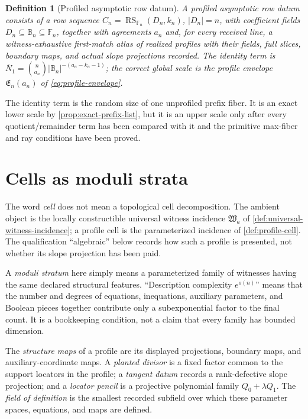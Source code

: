 \documentclass[12pt,a4paper]{amsart}
\numberwithin{equation}{section}
\newtheorem{definition}[definition]{Definition}
\theoremstyle{remark}
\DeclareMathOperator{\RS}{RS}
\newcommand{\F}{\mathbb F}
\newcommand{\B}{\mathbb B}
\newcommand{\barN}{\overline N}
\newcommand{\abs}[1]{\lvert #1\rvert}
\begin{document}
\begin{definition}[Profiled asymptotic row datum]
\label{def:asymptotic-row}
A \emph{profiled asymptotic row datum} consists of a row sequence
\(C_n=\RS_{\F_n}(D_n,k_n)\), \(\abs{D_n}=n\), with coefficient fields
\(D_n\subseteq\B_n\subseteq\F_n\), together with agreements \(a_n\)
and, for every received line, a witness-exhaustive first-match atlas of
realized profiles with their fields, full slices, boundary maps, and actual
slope projections recorded.  The identity term is
\(\barN_1=\binom n{a_n}\abs{\B_n}^{-(a_n-k_n-1)}\); the correct global
scale is the profile envelope \(\mathfrak E_n(a_n)\) of
\eqref{eq:profile-envelope}.
\end{definition}

The identity term is the random size of one unprofiled prefix fiber.  It is
an exact lower scale by \cref{prop:exact-prefix-list}, but it is an upper
scale only after every quotient/remainder term has been compared with it and
the primitive max-fiber and ray conditions have been proved.

\section{Cells as moduli strata}\label{sec:cells}

The word \emph{cell} does not mean a topological cell decomposition.  The
ambient object is the locally constructible universal witness incidence
\(\mathfrak W_a\) of \cref{def:universal-witness-incidence}; a profile
cell is the parameterized incidence of \cref{def:profile-cell}.  The
qualification ``algebraic'' below records how such a profile is presented,
not whether its slope projection has been paid.

A \emph{moduli stratum} here simply means a parameterized family of
witnesses having the same declared structural features.  ``Description
complexity \(e^{o(n)}\)'' means that the number and degrees of equations,
inequations, auxiliary parameters, and Boolean pieces together contribute
only a subexponential factor to the final count.  It is a bookkeeping
condition, not a claim that every family has bounded dimension.

The \emph{structure maps} of a profile are its displayed projections,
boundary maps, and auxiliary-coordinate maps.  A \emph{planted divisor}
is a fixed factor common to the support locators in the profile; a
\emph{tangent datum} records a rank-defective slope projection; and a
\emph{locator pencil} is a projective polynomial family
\(Q_0+\lambda Q_1\).  The \emph{field of definition} is the smallest
recorded subfield over which these parameter spaces, equations, and maps
are defined.
\end{document}
